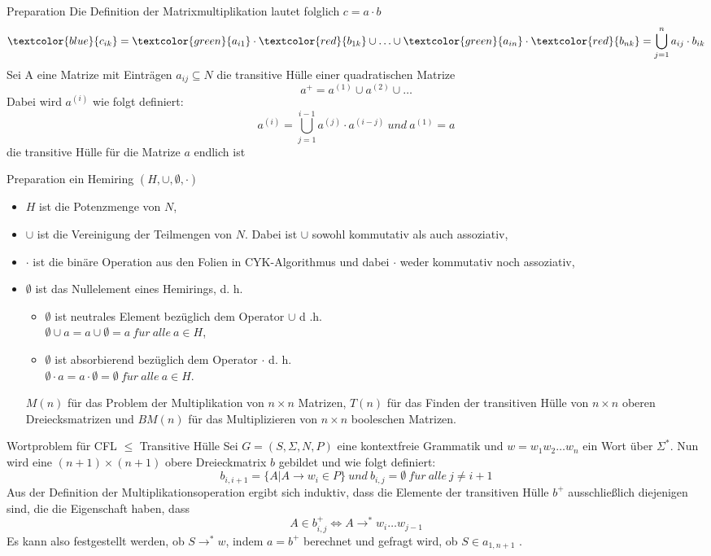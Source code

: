\documentclass{beamer}
\begin{document}
	\begin{frame}{Preparation}
		Die Definition der Matrixmultiplikation lautet folglich $c = a \cdot b$
		$$\textcolor{blue}{c_{ik}} = \textcolor{green}{a_{i1}} \cdot \textcolor{red}{b_{1k}} \cup \ldots \cup \textcolor{green}{a_{in}} \cdot \textcolor{red}{b_{nk}} =  \bigcup_{j=1}^{n} a_{ij} \cdot b_{ik}$$
		Sei A eine Matrize mit Einträgen $a_{ij} \subseteq N$
		die transitive Hülle einer quadratischen Matrize
		$$a^+ = a^{(1)} \cup a^{(2)} \cup \ldots$$
		Dabei wird $a^{(i)}$ wie folgt definiert:
		$$a^{(i)} = \bigcup_{j=1}^{i-1} a^{(j)} \cdot a^{(i-j)} \  und \ a^{(1)} = a$$
		die transitive Hülle für die Matrize $a$ endlich ist
	\end{frame}

	\begin{frame}{Preparation}
		ein Hemiring $(H, \cup, \emptyset,\cdot)$
		\begin{itemize}
			\item $H$ ist die Potenzmenge von $N$,
			\item $\cup$ ist die Vereinigung der Teilmengen von $N$. Dabei ist $\cup$ sowohl kommutativ als auch assoziativ,
			\item $\cdot$ ist die binäre Operation aus den Folien in CYK-Algorithmus und dabei $\cdot$ weder kommutativ noch assoziativ,
			\item $\emptyset$ ist das Nullelement eines Hemirings, d. h.
			\begin{itemize}
				\item $\emptyset$ ist neutrales Element bezüglich dem Operator $\cup$ d .h. \\
				$\emptyset \cup a = a \cup \emptyset = a \ f\ddot{u}r \ alle \ a\in H$, 
				\item $\emptyset$ ist absorbierend bezüglich dem Operator $\cdot$ d. h. \\
				$\emptyset \cdot a = a \cdot \emptyset = \emptyset \ f\ddot{u}r \ alle \ a\in H$.
			\end{itemize}
			$M(n)$ für das Problem der Multiplikation von $n\times n$ Matrizen, $T(n)$ für das Finden der transitiven Hülle von $n  \times n$ oberen Dreiecksmatrizen und $BM(n)$ für das Multiplizieren von $n \times n$ booleschen Matrizen. 
		\end{itemize}
	\end{frame}

	\begin{frame}{Wortproblem für CFL $\le$ Transitive Hülle}
		Sei $G = (S, \Sigma, N, P)$ eine kontextfreie Grammatik und $w=w_1 w_2 \ldots w_n$ ein Wort über $\Sigma^*$.
		Nun wird eine $(n+1)\times (n+1)$ obere Dreieckmatrix $b$ gebildet und wie folgt definiert:
		$$b_{i,i+1} = \{ A | A\to w_i \in P\} \ und \ b_{i,j}= \emptyset \ f\ddot{u}r \ alle \ j \neq i+1$$
		Aus der Definition der Multiplikationsoperation ergibt sich induktiv, dass die
		Elemente der transitiven Hülle $b^+$ ausschließlich diejenigen sind, die die Eigenschaft haben, dass 
		$$A \in b_{i,j}^+ \Leftrightarrow A \to^* w_i \ldots w_{j-1}$$
		Es kann also festgestellt werden, ob $S \to^* w$, indem $a = b^+$ berechnet und
		gefragt wird, ob $S \in a_{1,n+1}$ .
	\end{frame}
\end{document}

